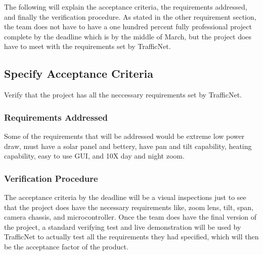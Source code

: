 The following will explain the acceptance criteria, the requirements addressed, and finally the verification procedure. As stated in the other requirement section, the team does not have to have a one hundred percent fully professional project complete by the deadline which is by the middle of March, but the project does have to meet with the requirements set by TrafficNet. 

\subsection{Specify Acceptance Criteria}
Verify that the project has all the neccessary requirements set by TrafficNet.
\subsubsection{Requirements Addressed}
Some of the requirements that will be addressed would be extreme low power draw, must have a solar panel and bettery, have pan and tilt capability, heating capability,  easy to use GUI, and 10X day and night zoom.
\subsubsection{Verification Procedure}
The acceptance criteria by the deadline will be a visual inspections just to see that the project does have the necessary requirements like, zoom lens, tilt, span, camera chassis, and microcontroller. Once the team does have the final version of the project, a standard verifying test and live demonstration will be used by TrafficNet to actually test all the requirements they had specified, which will then be the acceptance factor of the product.

